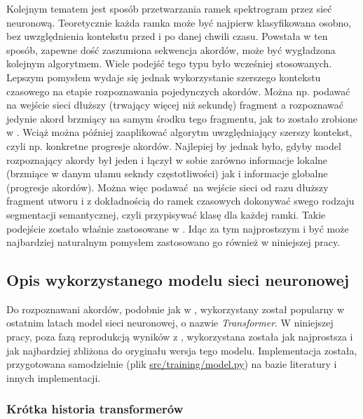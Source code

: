 Kolejnym tematem jest sposób przetwarzania ramek spektrogram przez sieć neuronową. Teoretycznie
każda ramka może być najpierw klasyfikowana osobno, bez uwzględnienia kontekstu przed i po danej
chwili czasu. Powstała w ten sposób, zapewne dość zaszumiona sekwencja akordów, może być wygładzona
kolejnym algorytmem. Wiele podejść tego typu było wcześniej stosowanych. Lepszym pomysłem wydaje się
jednak wykorzystanie szerszego kontekstu czasowego na etapie rozpoznawania pojedynczych akordów.
Można np.  podawać na wejście sieci dłuższy (trwający więcej niż sekundę) fragment a rozpoznawać
jedynie akord brzmiący na samym środku tego fragmentu, jak to zostało zrobione w
\cite{korzeniowski_fully_2016}.  Wciąż można później zaaplikować algorytm uwzględniający szerszy
kontekst, czyli np. konkretne progresje akordów. Najlepiej by jednak było, gdyby model rozpoznający
akordy był jeden i łączył w sobie zarówno informacje lokalne (brzmiące w danym ułamu sekndy
częstotliwości) jak i informacje globalne (progresje akordów). Można więc podawać na wejście sieci
od razu dłuższy fragment utworu i z dokładnością do ramek czasowych dokonywać swego rodzaju
segmentacji semantycznej, czyli przypisywać klasę dla każdej ramki. Takie podejście zostało właśnie
zastosowane w \cite{park_bi-directional_2019}. Idąc za tym najprostszym i być może najbardziej
naturalnym pomysłem zastosowano go również w niniejszej pracy. 



\subsection{Opis wykorzystanego modelu sieci neuronowej}

Do rozpoznawani akordów, podobnie jak w \cite{park_bi-directional_2019}, wykorzystany został
popularny w ostatnim latach model sieci neuronowej, o nazwie \emph{Transformer}. W niniejszej pracy,
poza fazą reprodukcją wyników z \cite{park_bi-directional_2019}, wykorzystana została jak
najprostsza i jak najbardziej zbliżona do oryginału wersja tego modelu. Implementacja została,
przygotowana samodzielnie (plik \url{src/training/model.py}) na bazie literatury i innych
implementacji.

\subsubsection{Krótka historia transformerów}

